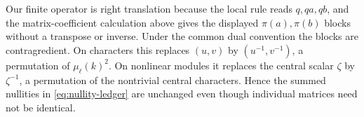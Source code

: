 \begin{remark}\label{rem:left-right}
Our finite operator is right translation because the local rule reads
$q,qa,qb$, and the matrix-coefficient calculation above gives the displayed
$\pi(a),\pi(b)$ blocks without a transpose or inverse.  Under the common
dual convention the blocks are contragredient.  On characters this replaces
$(u,v)$ by $(u^{-1},v^{-1})$, a permutation of
$\mu_\ell(k)^2$.  On nonlinear modules it replaces the central scalar
$\zeta$ by $\zeta^{-1}$, a permutation of the nontrivial central characters.
Hence the summed nullities in \eqref{eq:nullity-ledger} are unchanged even
though individual matrices need not be identical.
\end{remark}
